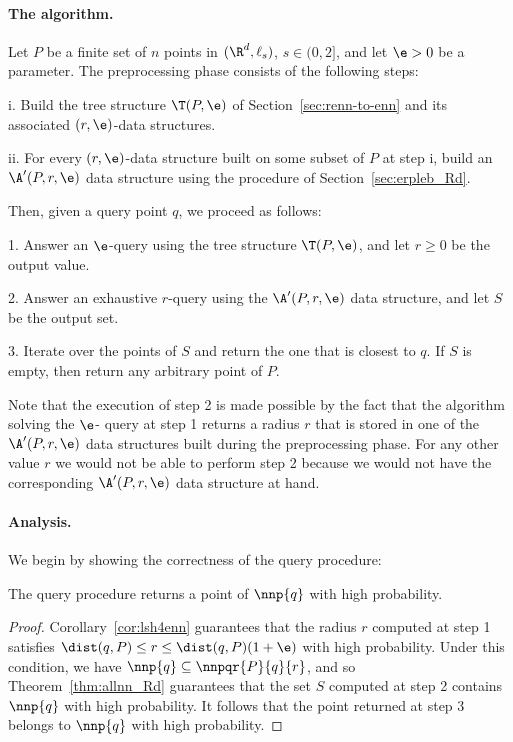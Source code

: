 \paragraph{The algorithm.} Let $P$ be a finite set of $n$ points in $(\R^d, \ell_s)$, $s\in (0,2]$, and let $\e>0$ be a parameter. The preprocessing phase
consists of the following steps:
\begin{slist}
\item[i.] Build the tree structure $\T(P,\e)$ of
  Section~\ref{sec:renn-to-enn} and its associated $(r,\e)$-\pleb data
  structures.
\item[ii.] For every $(r,\e)$-\pleb data structure built on some subset
  of $P$ at step i, build an $\A'(P, r,\e)$ data structure using the
  procedure of Section~\ref{sec:erpleb_Rd}.
\end{slist}
Then, given a query point $q$, we proceed as follows:
\begin{slist}
\item[1.] Answer an $\e$-\nn query using the tree structure $\T(P,\e)$,
  and let $r\geq 0$ be the output value.
\item[2.] Answer an exhaustive $r$-\pleb query using the $\A'(P,r,\e)$
  data structure, and let $S$ be the output set.
\item[3.] Iterate over the points of $S$ and return the one that is
  closest to $q$. If $S$ is empty, then return any arbitrary point of $P$.
\end{slist}
Note that the execution of step 2 is
made possible by the fact that the algorithm solving the $\e$-\nn
query at step 1 returns a radius $r$ that is stored in one of the
$\A'(P,r,\e)$ data structures built during the preprocessing
phase. For any other value $r$ we would not be able to perform step 2
because we would not have the corresponding $\A'(P,r,\e)$ data
structure at hand.

\paragraph{Analysis.} We begin by showing the correctness of the 
query procedure:

\begin{lem}\label{lem:exact-nn_correct}
The query procedure returns a point of $\nnp{q}$ with high probability.
\end{lem}
\begin{proof}
Corollary~\ref{cor:lsh4enn} guarantees that the radius $r$ computed at
step 1 satisfies $\dist(q,P)\leq r \leq \dist(q,P)(1+\e)$ with high
probability. Under this condition, we have $\nnp{q}\subseteq
\nnpqr{P}{q}{r}$, and so Theorem~\ref{thm:allnn_Rd} guarantees that
the set $S$ computed at step 2 contains $\nnp{q}$ with high
probability. It follows that the point returned at step 3 belongs to
$\nnp{q}$ with high probability.
\end{proof}

